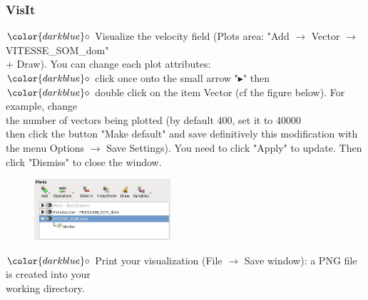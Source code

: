 \documentclass[10pt, hyperref={unicode=true,pdfusetitle, bookmarks=true,bookmarksnumbered=false,bookmarksopen=false, breaklinks=false,pdfborder={0 0 1},backref=true,colorlinks=true,linkcolor=darkblue,pageanchor}]{beamer}
\begin{document}
\begin{frame}
\frametitle{VisIt}
\begin{block}{}

\hspace{1cm} $\color{darkblue}\circ$ {\small{Visualize the velocity field ({\footnotesize{Plots area: "Add $\rightarrow$ Vector $\rightarrow$ VITESSE\_SOM\_dom"}}\\
\hspace{1.3cm} {\footnotesize{ + Draw)}}. You can change each plot attributes:}}\\
\vspace{0.05cm}
\hspace{1.5cm} $\color{darkblue}\diamond$ {\footnotesize{click once onto the small arrow "$\blacktriangleright$" then }}\\
\hspace{1.5cm} $\color{darkblue}\diamond$ {\footnotesize{double click on the item Vector (cf the figure below). For example, change \\
\hspace{1.8cm} the number of vectors being plotted (by default 400, set it to 40000 \\
\hspace{1.8cm} then click the button "Make default" and save definitively this modification with \\
\hspace{1.8cm} the menu Options $\rightarrow$ Save Settings). You need to click "Apply" to update. Then \\
\hspace{1.8cm} click "Dismiss" to close the window.}}\\

\begin{figure}
\includegraphics[width=0.45\textwidth]{PICTURES/visit3.jpg}
\end{figure}

\hspace{1cm} $\color{darkblue}\circ$ {\small{Print your visualization (File $\rightarrow$ Save window): a PNG file is created into your \\
\hspace{1.3cm} working directory.}}

\end{block}
\end{frame}
\end{document}
